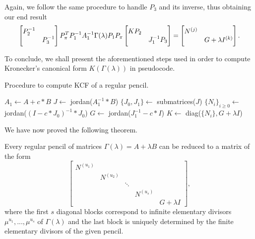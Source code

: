 Again, we follow the same procedure to handle \(P_{3}\) and its inverse, thus obtaining our end result
\begin{gather}
    \scalemath{0.975}{
        \begin{bmatrix}
            P_{2}^{-1} & \\
            & P_{3}^{-1}
        \end{bmatrix}
        P_{\pi}^T P_{1}^{-1} A_{1}^{-1} \Gamma(\lambda) P_{1} P_{\pi}
        \begin{bmatrix}
            KP_{2} & \\
            & J_{1}^{-1}P_{3}
        \end{bmatrix} =
        \begin{bmatrix}
            N^{(j)} & \\
            & G + \lambda I^{(k)}
        \end{bmatrix}. \label{gamma-reg}
    }
\end{gather}

To conclude, we shall present the aforementioned steps used in order to compute Kronecker's canonical form
\(K(\Gamma(\lambda))\) in pseudocode.
\begin{algorithm}
    \caption{Procedure to compute KCF of a regular pencil.}\label{alg:kcf-regular}
    $A_{1} \gets A + c*B$\;
    $J \gets $ jordan($A_{1}^{-1}*B$)\;
    $\{J_{0}, J_{1}\} \gets$ submatrices($J$)\;
    $\{N_{i}\}_{i \geq 0} \gets $ jordan($(I - c*J_{0})^{-1} * J_{0}$)\;
    $G \gets $ jordan($J_{1}^{-1} - c*I$)\;
    $K \gets $ diag($\{N_{i}\}, G +\lambda I$)\;
\end{algorithm}

We have now proved the following theorem.
\begin{theorem}
    Every regular pencil of matrices \(\Gamma(\lambda) = A + \lambda B\) can be reduced to a matrix of the form
    \[
        \begin{bmatrix}
            N^{(u_{1})} \\
            & N^{(u_{2})} \\
            & & \ddots \\
            & & & N^{(u_{s})} \\
            & & & & G + \lambda I
        \end{bmatrix},
    \]
    where the first \(s\) diagonal blocks correspond to infinite elementary divisors
    \(\mu^{u_{1}}, ..., \mu^{u_{s}}\) of \(\Gamma(\lambda)\) and the last block is uniquely determined by the
    finite elementary divisors of the given pencil.
\end{theorem}

